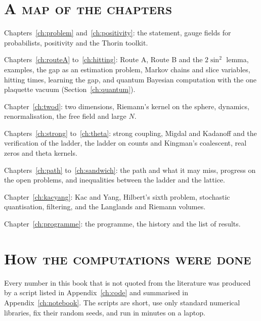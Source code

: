 \documentclass[11pt,twoside,openany]{book}
\theoremstyle{plainsc}
\theoremstyle{defsc}
\begin{document}
\section*{\normalfont\large\scshape A map of the chapters}
\begin{description}\itemsep2pt
\item[\normalfont\scshape The problem.] Chapters~\ref{ch:problem} and~\ref{ch:positivity}: the statement, gauge fields for probabilists, positivity and the Thorin toolkit.
\item[\normalfont\scshape Routes and estimation.] Chapters~\ref{ch:routeA} to~\ref{ch:hitting}: Route A, Route B and the $2\sin^2$ lemma, examples, the gap as an estimation problem, Markov chains and slice variables, hitting times, learning the gap, and quantum Bayesian computation with the one plaquette vacuum (Section~\ref{ch:quantum}).
\item[\normalfont\scshape Exact models.] Chapter~\ref{ch:twod}: two dimensions, Riemann's kernel on the sphere, dynamics, renormalisation, the free field and large $N$.
\item[\normalfont\scshape The ladder.] Chapters~\ref{ch:strong} to~\ref{ch:theta}: strong coupling, Migdal and Kadanoff and the verification of the ladder, the ladder on counts and Kingman's coalescent, real zeros and theta kernels.
\item[\normalfont\scshape Open problems.] Chapters~\ref{ch:path} to~\ref{ch:sandwich}: the path and what it may miss, progress on the open problems, and inequalities between the ladder and the lattice.
\item[\normalfont\scshape Neighbours.] Chapter~\ref{ch:kacyang}: Kac and Yang, Hilbert's sixth problem, stochastic quantisation, filtering, and the Langlands and Riemann volumes.
\item[\normalfont\scshape Summing up.] Chapter~\ref{ch:programme}: the programme, the history and the list of results.
\end{description}
\clearpage
\thispagestyle{plain}
\section*{\normalfont\large\scshape How the computations were done}
Every number in this book that is not quoted from the literature was produced by a script listed in Appendix~\ref{ch:code} and summarised in Appendix~\ref{ch:notebook}. The scripts are short, use only standard numerical libraries, fix their random seeds, and run in minutes on a laptop.
\end{document}
